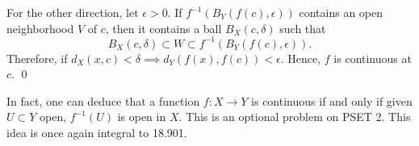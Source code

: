 For the other direction, let $\epsilon>0$. If $f^{-1}(B_Y(f(c),\epsilon))$ contains an open neighborhood $V$ of $c$, then it contains a ball $B_X(c,\delta)$ such that 
\[
B_X(c,\delta) \subset W\subset  f^{-1}(B_Y(f(c),\epsilon)).
\]
Therefore, if $d_X(x,c) <\delta \implies d_Y(f(x),f(c))<\epsilon$. Hence, $f$ is continuous at $c$. \qed 

\begin{remark}
In fact, one can deduce that a function $f:X\to Y$ is continuous if and only if given $U\subset Y$ open, $f^{-1}(U)$ is open in $X$. This is an optional problem on PSET 2. This idea is once again integral to 18.901.
\end{remark}